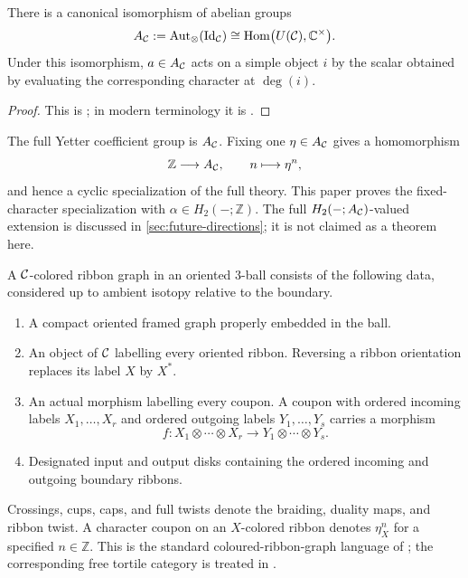 \begin{proposition}
\label{prop:characters-universal-grading}
There is a canonical isomorphism of abelian groups
\[
  A_{\mathcal{C}}:=\operatorname{Aut}_{\otimes}
    (\operatorname{Id}_{\mathcal{C}})
  \cong
  \operatorname{Hom}\bigl(U(\mathcal{C}),\mathbb C^\times\bigr).
\]
Under this isomorphism, $a\in A_{\mathcal{C}}$ acts on a simple object $i$ by
the scalar obtained by evaluating the corresponding character at
$\deg(i)$.
\end{proposition}

\begin{proof}
This is \cite[Proposition~4]{Yetter1993}; in modern terminology it is
\cite[Proposition~4.14.3]{EGNO2015}.
\end{proof}

\begin{remark}
\label{rem:full-cyclic-twists}
The full Yetter coefficient group is $A_{\mathcal{C}}$.  Fixing one
$\eta\in A_{\mathcal{C}}$ gives a homomorphism
\[
  \mathbb Z\longrightarrow A_{\mathcal{C}},\qquad n\longmapsto\eta^n,
\]
and hence a cyclic specialization of the full theory.  This paper proves the
fixed-character specialization with $\alpha\in H_2(-;\mathbb Z)$.  The full
$H_2(-;A_{\mathcal{C}})$-valued extension is discussed in
\cref{sec:future-directions}; it is not claimed as a theorem here.
\end{remark}

\begin{definition}
\label{def:colored-ribbon-graph}
A $\mathcal{C}$-colored ribbon graph in an oriented $3$-ball consists of the
following data, considered up to ambient isotopy relative to the boundary.
\begin{enumerate}[label=(\roman*),ref=\roman*]
  \item\label{item:ribbon-embedding}
  A compact oriented framed graph properly embedded in the ball.

  \item\label{item:ribbon-labels}
  An object of $\mathcal{C}$ labelling every oriented ribbon.  Reversing a ribbon
  orientation replaces its label $X$ by $X^*$.

  \item\label{item:ribbon-coupons}
  An actual morphism labelling every coupon.  A coupon with ordered incoming
  labels $X_1,\ldots,X_r$ and ordered outgoing labels
  $Y_1,\ldots,Y_s$ carries a morphism
  \[
    f\colon X_1\otimes\cdots\otimes X_r
    \longrightarrow Y_1\otimes\cdots\otimes Y_s.
  \]

  \item\label{item:ribbon-boundary}
  Designated input and output disks containing the ordered incoming and
  outgoing boundary ribbons.
\end{enumerate}
Crossings, cups, caps, and full twists denote the braiding, duality maps, and
ribbon twist.  A character coupon on an $X$-colored ribbon denotes
$\eta_X^n$ for a specified $n\in\mathbb Z$.
This is the standard coloured-ribbon-graph language of
\cite[Chapter~2, Sections~2.2--2.3]{BakalovKirillov2001}; the corresponding
free tortile category is treated in \cite[Theorem~6.1]{Shum1994}.
\end{definition}

